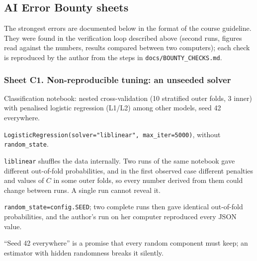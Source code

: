 \subsection*{AI Error Bounty sheets}

The strongest errors are documented below in the format of the course guideline. They were found in
the verification loop described above (second runs, figures read against the numbers, results compared
between two computers); each check is reproduced by the author from the steps in
\texttt{docs/\allowbreak{}BOUNTY\_\allowbreak{}CHECKS.\allowbreak{}md}.

\subsubsection*{Sheet C1. Non-reproducible tuning: an unseeded solver}
\begin{description}[style=nextline, leftmargin=1.2em]
  \item[Prompt] Classification notebook: nested cross-validation (10 stratified outer folds, 3 inner)
        with penalised logistic regression (L1/L2) among other models, seed 42 everywhere.
  \item[Faulty code] \texttt{LogisticRegression(solver="liblinear", max\_\allowbreak{}iter=5000)}, without
        \texttt{random\_state}.
  \item[Proof] \texttt{liblinear} shuffles the data internally. Two runs of the same notebook gave
        different out-of-fold probabilities, and in the first observed case different penalties and
        values of $C$ in some outer folds, so every number derived from them could change between runs. A single run cannot reveal it.
  \item[Correction] \texttt{random\_\allowbreak{}state=config.\allowbreak{}SEED}; two complete runs then gave identical
        out-of-fold probabilities, and the author's run on her computer reproduced every JSON value.
  \item[Reproduction] 
  \item[Reflection] ``Seed 42 everywhere'' is a promise that every random component must keep; an
        estimator with hidden randomness breaks it silently.
\end{description}

